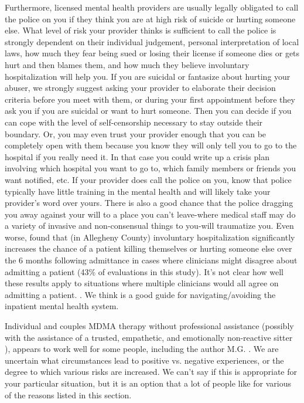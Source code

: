 \documentclass[12pt,letterpaper]{book}
\begin{document}
Furthermore, licensed mental health providers are usually legally obligated to call the police on you if they think you are at high risk of suicide or hurting someone else. What level of risk your provider thinks is sufficient to call the police is strongly dependent on their individual judgement, personal interpretation of local laws, how much they fear being sued or losing their license if someone dies or gets hurt and then blames them, and how much they believe involuntary hospitalization will help you. If you are suicidal or fantasize about hurting your abuser, we strongly suggest asking your provider to elaborate their decision criteria before you meet with them, or during your first appointment before they ask you if you are suicidal or want to hurt someone. Then you can decide if you can cope with the level of self-censorship necessary to stay outside their boundary. Or, you may even trust your provider enough that you can be completely open with them because you know they will only tell you to go to the hospital if you really need it. In that case you could write up a crisis plan involving which hospital you want to go to, which family members or friends you want notified, etc. If your provider does call the police on you, know that police typically have little training in the mental health and will likely take your provider's word over yours. There is also a good chance that the police dragging you away against your will to a place you can't leave-where medical staff may do a variety of invasive and non-consensual things to you-will traumatize you. Even worse, \textcite{emanuelHospitalization} found that (in Allegheny County) involuntary hospitalization significantly increases the chance of a patient killing themselves or hurting someone else over the 6 months following admittance in cases where clinicians might disagree about admitting a patient (43\% of evaluations in this study). It's not clear how well these results apply to situations where multiple clinicians would all agree on admitting a patient. \cite{emanuelHospitalization}. We think \textcite{alexanderInpatient} is a good guide for navigating/avoiding the inpatient mental health system.

Individual and couples MDMA therapy without professional assistance (possibly with the assistance of a trusted, empathetic, and emotionally non-reactive sitter \cite{thalSitter}), appears to work well for some people, including the author M.G. \cite{hillsSolo,colbertEvenings}. We are uncertain what circumstances lead to positive vs. negative experiences, or the degree to which various risks are increased. We can't say if this is appropriate for your particular situation, but it is an option that a lot of people like for various of the reasons listed in this section.
\end{document}

